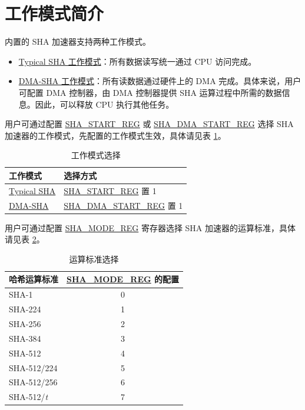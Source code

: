 \documentclass[main\_\_CN.tex]{subfiles}
\begin{document}
\section{工作模式简介}
\chipname{} 内置的 SHA 加速器支持两种工作模式。

\begin{itemize}
    \item \hyperref[sec:sha-typical-sha]{Typical SHA 工作模式}：所有数据读写统一通过 CPU 访问完成。
    \item \hyperref[sec:sha-dma-sha]{DMA-SHA 工作模式}：所有读数据通过硬件上的 DMA 完成。具体来说，用户可配置 DMA 控制器，由 DMA 控制器提供 SHA 运算过程中所需的数据信息。因此，可以释放 CPU 执行其他任务。
\end{itemize}

用户可通过配置 \hyperref[regdesc:SHASTARTREG]{SHA\_START\_REG} 或 \hyperref[regdesc:SHADMASTARTREG]{SHA\_DMA\_START\_REG} 选择 SHA 加速器的工作模式，先配置的工作模式生效，具体请见表 \ref{tab:sha-working-mode}。

\begin{longtable}[c]{ |l|l| }
\caption{工作模式选择}
\label{tab:sha-working-mode}
\\\hline
\rowcolor{lightgray}
工作模式      & 选择方式\\
    \hline
    \hyperref[sec:sha-typical-sha]{Typical SHA}      &  \hyperref[regdesc:SHASTARTREG]{SHA\_START\_REG} 置 1   \\
    \hline
    \hyperref[sec:sha-dma-sha]{DMA-SHA}           &  \hyperref[regdesc:SHADMASTARTREG]{SHA\_DMA\_START\_REG} 置 1   \\
    \hline
\end{longtable}

用户可通过配置 \hyperref[regdesc:SHAMODEREG]{SHA\_MODE\_REG} 寄存器选择 SHA 加速器的运算标准，具体请见表 \ref{tab:sha-hash-algo-select}。

\begin{longtable}[c]{|l|c|}
\caption{运算标准选择}
\label{tab:sha-hash-algo-select}
\\\hline
\rowcolor{lightgray}
哈希运算标准 & \hyperref[regdesc:SHAMODEREG]{SHA\_MODE\_REG} 的配置\\
    \hline
    SHA-1 & 0\\
    \hline
    SHA-224 & 1\\
    \hline
    SHA-256 & 2\\
    \hline
    SHA-384 & 3\\
    \hline
    SHA-512 & 4\\
    \hline
    SHA-512/224 & 5\\
    \hline
    SHA-512/256 & 6\\
    \hline
    SHA-512/{\it{t}} & 7\\
    \hline
\end{longtable}
\end{document}
